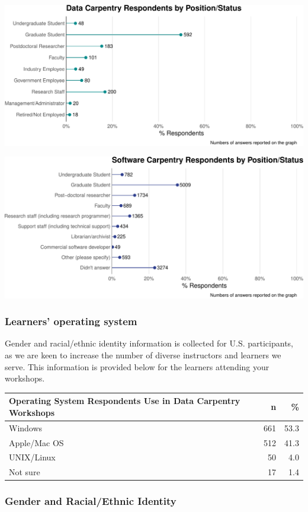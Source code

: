 \documentclass[]{article}
\makeatletter
\def\maxwidth{\ifdim\Gin@nat@width>\linewidth\linewidth\else\Gin@nat@width\fi}
\makeatother
\begin{document}
\includegraphics[width=\maxwidth]{../figures/dc-status-plot-1}

\includegraphics[width=\maxwidth]{../figures/swc-status-plot-1}

\subsubsection{Learners' operating
system}\label{learners-operating-system}

Gender and racial/ethnic identity information is collected for U.S.
participants, as we are keen to increase the number of diverse
instructors and learners we serve. This information is provided below
for the learners attending your workshops.

\begin{longtable}[]{@{}lrr@{}}
\toprule
Operating System Respondents Use in Data Carpentry Workshops & n &
\%\tabularnewline
\midrule
\endhead
Windows & 661 & 53.3\tabularnewline
Apple/Mac OS & 512 & 41.3\tabularnewline
UNIX/Linux & 50 & 4.0\tabularnewline
Not sure & 17 & 1.4\tabularnewline
\bottomrule
\end{longtable}

\subsubsection{Gender and Racial/Ethnic
Identity}\label{gender-and-racialethnic-identity}
\end{document}
